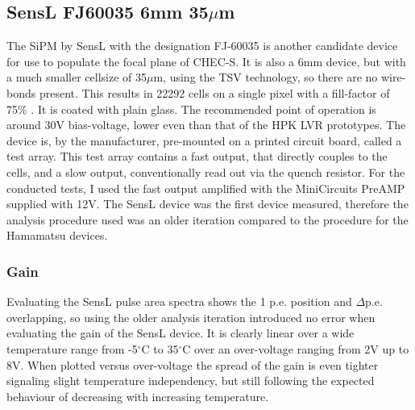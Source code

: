 \documentclass[12pt,article,type=msc,colorback,accentcolor=tud9c]{tudthesis}
\begin{document}
\subsection{SensL FJ60035 6mm 35$\mu$m}
The SiPM by SensL with the designation FJ-60035 is another candidate device for use to populate the focal plane of CHEC-S. It is also a 6mm device, but with a much smaller cellsize of 35$\mu$m, using the TSV technology, so there are no wire-bonds present. This results in 22292 cells on a single pixel with a fill-factor of 75\% . It is coated with plain glass. The recommended point of operation is around 30V bias-voltage, lower even than that of the HPK LVR prototypes. The device is, by the manufacturer, pre-mounted on a printed circuit board, called a test array. This test array contains a fast output, that directly couples to the cells, and a slow output, conventionally read out via the quench resistor. For the conducted tests, I used the fast output amplified with the MiniCircuits PreAMP supplied with 12V. The SensL device was the first device measured, therefore the analysis procedure used was an older iteration compared to the procedure for the Hamamatsu devices. 

\begin{figure}[h]
\begin{centering}
}
\caption[SensL FJ60035 SiPM and average pulse shape]{SensL Test Array and the average pulse shape at $V_{bias-voltage} = 29V$}
\label{fig:SensL_Array_PS}
\end{centering}
\end{figure}


\subsubsection{Gain}
\label{subsubsec:SensLGain}

Evaluating the SensL pulse area spectra shows the 1 p.e. position and $\Delta$p.e. overlapping, so using the older analysis iteration introduced no error when evaluating the gain of the SensL device. It is clearly linear over a wide temperature range from -5$^\circ$C to 35$^\circ$C over an over-voltage ranging from 2V up to 8V. When plotted versus over-voltage the spread of the gain is even tighter signaling slight temperature independency, but still following the expected behaviour of decreasing with increasing temperature.
\end{document}
